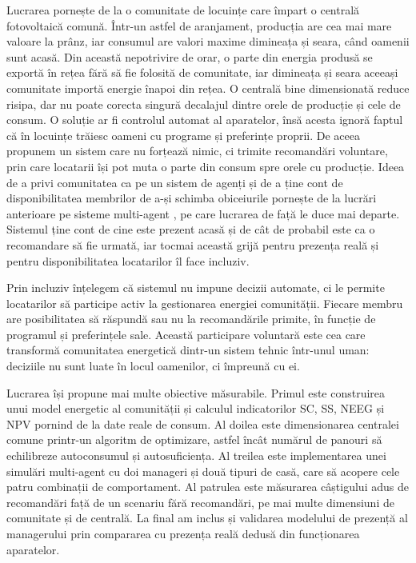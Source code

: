 \documentclass[12pt,a4paper]{report}
\begin{document}
Lucrarea pornește de la o comunitate de locuințe care împart o centrală fotovoltaică comună. Într-un astfel de aranjament, producția are cea mai mare valoare la prânz, iar consumul are valori maxime dimineața și seara, când oamenii sunt acasă. Din această nepotrivire de orar, o parte din energia produsă se exportă în rețea fără să fie folosită de comunitate, iar dimineața și seara aceeași comunitate importă energie înapoi din rețea. O centrală bine dimensionată reduce risipa, dar nu poate corecta singură decalajul dintre orele de producție și cele de consum. O soluție ar fi controlul automat al aparatelor, însă acesta ignoră faptul că în locuințe trăiesc oameni cu programe și preferințe proprii. De aceea propunem un sistem care nu forțează nimic, ci trimite recomandări voluntare, prin care locatarii își pot muta o parte din consum spre orele cu producție. Ideea de a privi comunitatea ca pe un sistem de agenți și de a ține cont de disponibilitatea membrilor de a-și schimba obiceiurile pornește de la lucrări anterioare pe sisteme multi-agent \cite{simoiu2022aqtr, simoiu2022renewable}, pe care lucrarea de față le duce mai departe. Sistemul ține cont de cine este prezent acasă și de cât de probabil este ca o recomandare să fie urmată, iar tocmai această grijă pentru prezența reală și pentru disponibilitatea locatarilor îl face incluziv.

Prin incluziv înțelegem că sistemul nu impune decizii automate, ci le permite locatarilor să participe activ la gestionarea energiei comunității. Fiecare membru are posibilitatea să răspundă sau nu la recomandările primite, în funcție de programul și preferințele sale. Această participare voluntară este cea care transformă comunitatea energetică dintr-un sistem tehnic într-unul uman: deciziile nu sunt luate în locul oamenilor, ci împreună cu ei.

Lucrarea își propune mai multe obiective măsurabile. Primul este construirea unui model energetic al comunității și calculul indicatorilor SC, SS, NEEG și NPV pornind de la date reale de consum. Al doilea este dimensionarea centralei comune printr-un algoritm de optimizare, astfel încât numărul de panouri să echilibreze autoconsumul și autosuficiența. Al treilea este implementarea unei simulări multi-agent cu doi manageri și două tipuri de casă, care să acopere cele patru combinații de comportament. Al patrulea este măsurarea câștigului adus de recomandări față de un scenariu fără recomandări, pe mai multe dimensiuni de comunitate și de centrală. La final am inclus și validarea modelului de prezență al managerului prin compararea cu prezența reală dedusă din funcționarea aparatelor.
\end{document}
